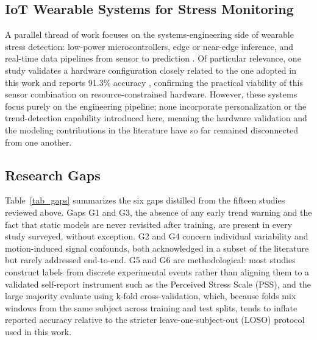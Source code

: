 \documentclass[conference]{IEEEtran}
\begin{document}
\subsection{IoT Wearable Systems for Stress Monitoring}
A parallel thread of work focuses on the systems-engineering
side of wearable stress detection: low-power microcontrollers,
edge or near-edge inference, and real-time data pipelines from
sensor to prediction \cite{b7}\cite{b13}\cite{b14}. Of
particular relevance, one study validates a hardware
configuration closely related to the one adopted in this work
and reports 91.3\% accuracy \cite{b10}, confirming the
practical viability of this sensor combination on
resource-constrained hardware. However, these systems focus
purely on the engineering pipeline; none incorporate
personalization or the trend-detection capability introduced
here, meaning the hardware validation and the modeling
contributions in the literature have so far remained
disconnected from one another.

\subsection{Research Gaps}
Table~\ref{tab_gaps} summarizes the six gaps distilled from
the fifteen studies reviewed above. Gaps G1 and G3, the
absence of any early trend warning and the fact that static
models are never revisited after training, are present in
every study surveyed, without exception. G2 and G4 concern
individual variability and motion-induced signal confounds,
both acknowledged in a subset of the literature but rarely
addressed end-to-end. G5 and G6 are methodological: most
studies construct labels from discrete experimental events
rather than aligning them to a validated self-report
instrument such as the Perceived Stress Scale (PSS), and the large
majority evaluate using k-fold cross-validation, which,
because folds mix windows from the same subject across
training and test splits, tends to inflate reported accuracy
relative to the stricter leave-one-subject-out (LOSO)
protocol used in this work.
\end{document}
